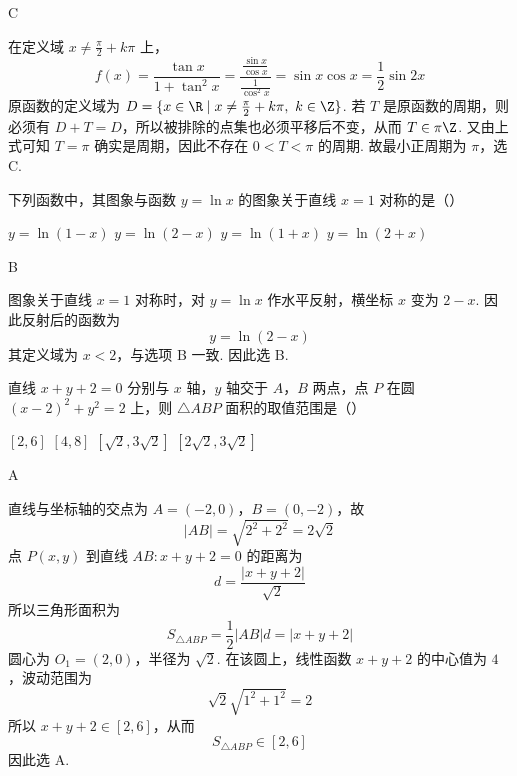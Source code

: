 \begin{answer}
C
\end{answer}

\begin{solution}
在定义域 \(x\ne\frac\pi2+k\pi\) 上，
\[
f(x)=\frac{\tan x}{1+\tan^2x}
=\frac{\frac{\sin x}{\cos x}}{\frac{1}{\cos^2x}}
=\sin x\cos x
=\frac12\sin2x
\]
原函数的定义域为 \(D=\{x\in\R\mid x\ne\frac\pi2+k\pi,\ k\in\Z\}\). 若 \(T\) 是原函数的周期，则必须有 \(D+T=D\)，所以被排除的点集也必须平移后不变，从而 \(T\in\pi\Z\). 又由上式可知 \(T=\pi\) 确实是周期，因此不存在 \(0<T<\pi\) 的周期. 故最小正周期为 \(\pi\)，选 C.
\end{solution}

\begin{problem}
下列函数中，其图象与函数 \(y=\ln x\) 的图象关于直线 \(x=1\) 对称的是（\quad）

\choices
    {\(y=\ln(1-x)\)}
    {\(y=\ln(2-x)\)}
    {\(y=\ln(1+x)\)}
    {\(y=\ln(2+x)\)}
\end{problem}

\begin{answer}
B
\end{answer}

\begin{solution}
图象关于直线 \(x=1\) 对称时，对 \(y=\ln x\) 作水平反射，横坐标 \(x\) 变为 \(2-x\). 因此反射后的函数为
\[
y=\ln(2-x)
\]
其定义域为 \(x<2\)，与选项 B 一致. 因此选 B.
\end{solution}

\begin{problem}
直线 \(x+y+2=0\) 分别与 \(x\) 轴，\(y\) 轴交于 \(A\)，\(B\) 两点，点 \(P\) 在圆 \((x-2)^2+y^2=2\) 上，则 \(\triangle ABP\) 面积的取值范围是（\quad）

\choices
    {\([2,6]\)}
    {\([4,8]\)}
    {\([\sqrt2,3\sqrt2]\)}
    {\([2\sqrt2,3\sqrt2]\)}
\end{problem}

\begin{answer}
A
\end{answer}

\begin{solution}
直线与坐标轴的交点为 \(A=(-2,0)\)，\(B=(0,-2)\)，故
\[
|AB|=\sqrt{2^2+2^2}=2\sqrt2
\]
点 \(P(x,y)\) 到直线 \(AB:x+y+2=0\) 的距离为
\[
d=\frac{|x+y+2|}{\sqrt2}
\]
所以三角形面积为
\[
S_{\triangle ABP}=\frac12|AB|d=|x+y+2|
\]
圆心为 \(O_1=(2,0)\)，半径为 \(\sqrt2\). 在该圆上，线性函数 \(x+y+2\) 的中心值为 \(4\)，波动范围为
\[
\sqrt2\sqrt{1^2+1^2}=2
\]
所以 \(x+y+2\in[2,6]\)，从而
\[
S_{\triangle ABP}\in[2,6]
\]
因此选 A.
\end{solution}

